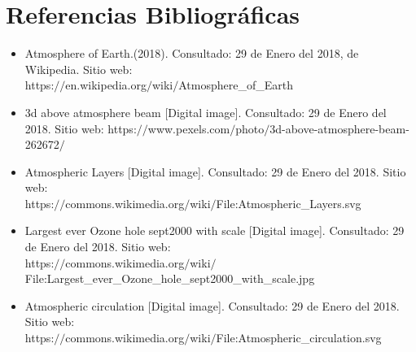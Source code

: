 \documentclass{article}
\begin{document}
\section{Referencias Bibliográficas}

\begin{itemize}
\item Atmosphere of Earth.(2018). Consultado: 29 de Enero del 2018, de Wikipedia. Sitio web: \\
https:$//$en.wikipedia.org$/$wiki$/$Atmosphere\_of\_Earth
\item 3d above atmosphere beam [Digital image]. Consultado: 29 de Enero del 2018. Sitio web: https:$//$www.pexels.com$/$photo$/$3d-above-atmosphere-beam-262672$/$ 
\item Atmospheric Layers [Digital image]. Consultado: 29 de Enero del 2018. Sitio web: \\ https:$//$commons.wikimedia.org$/$wiki$/$File:Atmospheric\_Layers.svg
\item Largest ever Ozone hole sept2000 with scale [Digital image]. Consultado: 29 de Enero del 2018. Sitio web: \\
https:$//$commons.wikimedia.org$/$wiki$/$File:Largest\_ever\_Ozone\_hole\_sept2000\_with\_scale.jpg
\item Atmospheric circulation [Digital image]. Consultado: 29 de Enero del 2018. Sitio web: \\
https:$//$commons.wikimedia.org$/$wiki$/$File:Atmospheric\_circulation.svg
\end{itemize}
\end{document}
